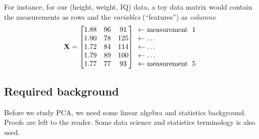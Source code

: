 \documentclass[a4paper]{article}
\begin{document}
For instance, for our (height, weight, IQ) data, a toy data matrix would contain the measurements as rows and the \textit{variables} (``features'') as \textit{columns}:
\[
\textbf{X} = \begin{bmatrix}
1.88 & 96 & 91 \\
1.90 & 78 & 125 \\
1.72 & 84 & 114 \\
1.79 & 89 & 100 \\
1.77 & 77 & 93 \\
\end{bmatrix}
\begin{array}{l}
    \leftarrow \textup{measurement\; 1}  \\
    \leftarrow \ldots  \\
    \leftarrow \ldots  \\
    \leftarrow \ldots  \\
    \leftarrow \textup{measurement\; 5}  \\
\end{array}
\]





\subsection{Required background}

Before we study PCA, we need some linear algebra and statistics background. Proofs are left to the reader. Some data science and statistics terminology is also used.
\end{document}
